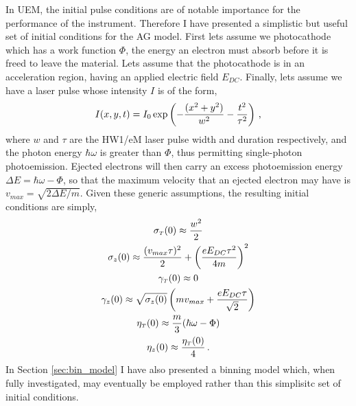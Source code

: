 In UEM, the initial pulse conditions are of notable importance for the performance of the instrument.
Therefore I have presented a simplistic but useful set of initial conditions for the AG model.
First lets assume we photocathode which has a work function $\Phi$, the energy an electron must absorb before it is freed to leave the material.
Lets assume that the photocathode is in an acceleration region, having an applied electric field $E_{DC}$.
Finally, lets assume we have a laser pulse whose intensity $I$ is of the form,
\begin{equation}
  I ( x , y , t ) = I_{0} \exp \left ( - \frac{ ( x^{2} +y^{2} ) }{ w^{2} } - \frac{ t^{ 2 } }{ \tau^{ 2 } } \right ) \, \text{,}
\end{equation}
where $w$ and $\tau$ are the HW1/eM laser pulse width and duration respectively, and the photon energy $\hbar \omega$ is greater than $\Phi$, thus permitting single-photon photoemission.
Ejected electrons will then carry an excess photoemission energy $\Delta E = \hbar \omega - \Phi$, so that the maximum velocity that an ejected electron may have is $ v_{max} = \sqrt{ 2 \Delta E / m } $.
Given these generic assumptions, the resulting initial conditions are simply,
\begin{subequations}
  \begin{gather}
    \sigma_{ {\scriptscriptstyle T} } ( 0 ) \approx \frac{ w^{ 2 } }{ 2 } \\
    \sigma_{ z } ( 0 ) \approx \frac{ ( v_{max} \tau )^{ 2 } }{ 2 } + \left ( \frac{ e E_{ DC } \tau^{ 2 } }{ 4 m } \right )^{ 2 } \\
    \gamma_{ {\scriptscriptstyle T} } ( 0 ) \approx 0 \\
    \gamma_{ z } ( 0 ) \approx \sqrt{ \sigma_{ z } ( 0 ) } \left ( m v_{max} + \frac{ e E_{DC} \tau }{ \sqrt{ 2 } } \right ) \\
    \eta_{ {\scriptscriptstyle T} } ( 0 ) \approx \frac{ m }{ 3 } ( \hbar \omega - \Phi ) \\
    \eta_{ z } ( 0 ) \approx \frac{ \eta_{ {\scriptscriptstyle T} } ( 0 ) }{ 4 } \, \text{.}
  \end{gather}
\end{subequations}
In Section \ref{sec:bin_model} I have also presented a binning model which, when fully investigated, may eventually be employed rather than this simplisitc set of initial conditions.

